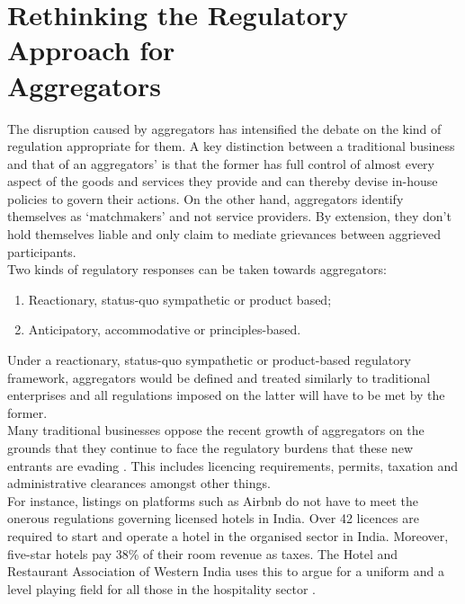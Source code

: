 \documentclass[a4paper, 12pt, twoside]{article}
\begin{document}
\section{Rethinking the Regulatory Approach for \\ Aggregators}
The disruption caused by aggregators has intensified the debate on the kind of regulation appropriate for them. A key distinction between a traditional business and that of an aggregators’ is that the former has full control of almost every aspect of the goods and services they provide and can thereby devise in-house policies to govern their actions. On the other hand, aggregators identify themselves as ‘matchmakers’ and not service providers. By extension, they don't hold themselves liable and only claim to mediate grievances between aggrieved participants. \\
          
             Two kinds of regulatory responses can be taken towards aggregators:         
                    \begin{enumerate}
                      \item  Reactionary, status-quo sympathetic or product based;
                      \item Anticipatory, accommodative or principles-based.
                    \end{enumerate}
                    
                 Under a reactionary, status-quo sympathetic or product-based regulatory framework, aggregators would be defined and treated similarly to traditional enterprises and all regulations imposed on the latter will have to be met by the former. \\
                 
Many traditional businesses oppose the recent growth of aggregators on the grounds that they continue to face the regulatory burdens that these new entrants are evading \parencite{koopman2014sharing}. This includes licencing requirements, permits, taxation and administrative clearances amongst other things. \\

For instance, listings on platforms such as Airbnb do not have to meet the onerous regulations governing licensed hotels in India. Over 42 licences are required to start and operate a hotel in the organised sector in India. Moreover, five-star hotels pay 38\% of their room revenue as taxes. The Hotel and Restaurant Association of Western India uses this to argue for a uniform and a level playing field for all those in the hospitality sector \parencite{Chaturvedinews}.\\
\end{document}
